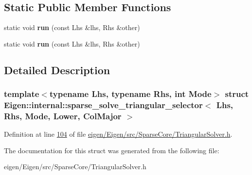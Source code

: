 \subsection*{Static Public Member Functions}
\begin{DoxyCompactItemize}
\item 
\mbox{\label{struct_eigen_1_1internal_1_1sparse__solve__triangular__selector_3_01_lhs_00_01_rhs_00_01_mode_00_01_lower_00_01_col_major_01_4_a97837ee63e37ccdd33461acb69429319}} 
static void {\bfseries run} (const Lhs \&lhs, Rhs \&other)
\item 
\mbox{\label{struct_eigen_1_1internal_1_1sparse__solve__triangular__selector_3_01_lhs_00_01_rhs_00_01_mode_00_01_lower_00_01_col_major_01_4_a97837ee63e37ccdd33461acb69429319}} 
static void {\bfseries run} (const Lhs \&lhs, Rhs \&other)
\end{DoxyCompactItemize}


\subsection{Detailed Description}
\subsubsection*{template$<$typename Lhs, typename Rhs, int Mode$>$\newline
struct Eigen\+::internal\+::sparse\+\_\+solve\+\_\+triangular\+\_\+selector$<$ Lhs, Rhs, Mode, Lower, Col\+Major $>$}



Definition at line \hyperlink{eigen_2_eigen_2src_2_sparse_core_2_triangular_solver_8h_source_l00104}{104} of file \hyperlink{eigen_2_eigen_2src_2_sparse_core_2_triangular_solver_8h_source}{eigen/\+Eigen/src/\+Sparse\+Core/\+Triangular\+Solver.\+h}.



The documentation for this struct was generated from the following file\+:\begin{DoxyCompactItemize}
\item 
eigen/\+Eigen/src/\+Sparse\+Core/\+Triangular\+Solver.\+h\end{DoxyCompactItemize}

